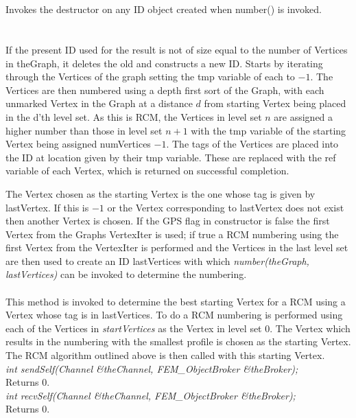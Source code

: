   \\
  \\
Invokes the destructor on any ID object created when number() is
invoked. \\

  \\
\\
If the present ID used for the result is not of size equal to the
number of Vertices in \p theGraph, it deletes the old and
constructs a new ID. Starts by iterating through the Vertices of the
graph setting the \p tmp variable of each to $-1$. The Vertices are
then numbered using a depth first sort of the Graph, with each
unmarked Vertex in the Graph at a distance $d$ from starting Vertex
being placed in the d'th level set. As this is RCM, the Vertices in
level set $n$ are assigned a higher number than those in level set
$n+1$ with the \p tmp variable of the starting Vertex being
assigned \p numVertices $-1$. The \p tags of the Vertices are
placed into the ID at location given by their \p tmp variable. These
are replaced with the \p ref variable of each Vertex, which is
returned on successful completion. 


The Vertex chosen as the starting Vertex is the one whose tag is given
by \p lastVertex. If this is $-1$ or the Vertex corresponding to
\p lastVertex does not exist then another Vertex is chosen. If the
\p GPS flag in constructor is \p false the first Vertex from the
Graphs VertexIter is used; if \p true a RCM numbering using the
first Vertex from the VertexIter is performed and the Vertices in the
last level set are then used to create an ID \p lastVertices with
which {\em number(theGraph, lastVertices)} can be invoked to determine
the numbering. \\


\\
This method is invoked to determine the best starting Vertex for a RCM
using a Vertex whose tag is in \p lastVertices. To do a RCM
numbering is performed using each of the Vertices in {\em
startVertices} as the Vertex in level set $0$. The Vertex which
results in the numbering with the smallest profile is chosen as 
the starting Vertex. The RCM algorithm outlined above is then called
with this starting Vertex. \\

{\em int sendSelf(Channel \&theChannel,
FEM\_ObjectBroker \&theBroker);} \\
Returns $0$. \\

{\em int recvSelf(Channel \&theChannel,
FEM\_ObjectBroker \&theBroker); } \\
Returns $0$.

